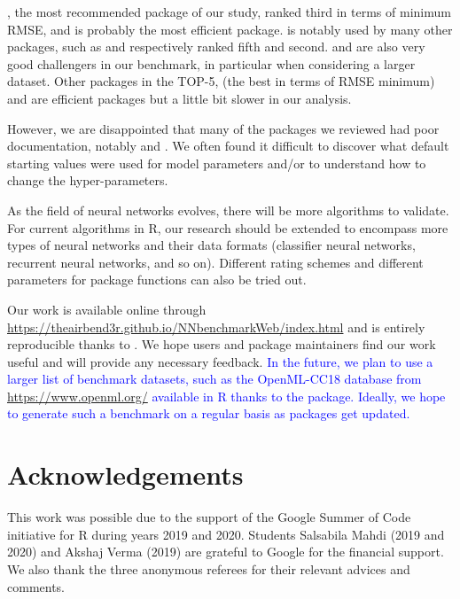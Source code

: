 , the most recommended package of our study, ranked third in
terms of minimum RMSE, and is probably the most efficient package.
 is notably used by many other packages, such as
 and  respectively ranked fifth and second.
 and  are also very good challengers in our
benchmark, in particular when considering a larger dataset. Other
packages in the TOP-5,  (the best in terms of RMSE minimum)
and  are efficient packages but a little bit slower in our
analysis.

However, we are disappointed that many of the packages we reviewed had
poor documentation, notably  and . We often
found it difficult to discover what default starting values were used
for model parameters and/or to understand how to change the
hyper-parameters.

As the field of neural networks evolves, there will be more algorithms
to validate. For current algorithms in R, our research should be
extended to encompass more types of neural networks and their data
formats (classifier neural networks, recurrent neural networks, and so
on). Different rating schemes and different parameters for package
functions can also be tried out.

Our work is available online through
\textcolor{blue}{\url{https://theairbend3r.github.io/NNbenchmarkWeb/index.html}}
and is entirely reproducible thanks to . We hope users
and package maintainers find our work useful and will provide any
necessary feedback.
\textcolor{blue}{In the future, we plan to use a larger list of benchmark
datasets, such as the OpenML-CC18 database from \url{https://www.openml.org/}
available in \textsf{R} thanks to the  package.
Ideally, we hope to generate such a benchmark on a regular basis as packages
get updated.}

\hypertarget{acknowledgements}{%
\section{Acknowledgements}\label{acknowledgements}}

This work was possible due to the support of the Google Summer of Code
initiative for R during years 2019 and 2020. Students Salsabila Mahdi
(2019 and 2020) and Akshaj Verma (2019) are grateful to Google for the
financial support. We also thank the three anonymous referees for their
relevant advices and comments.

